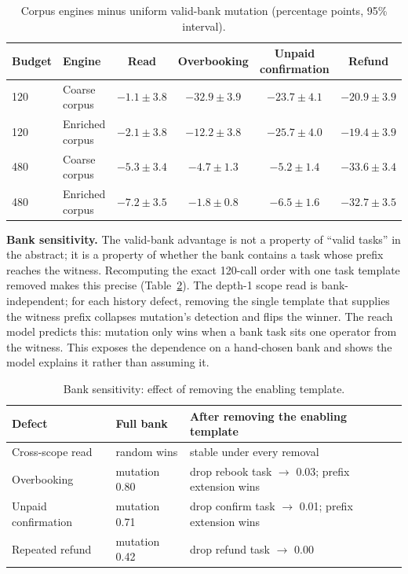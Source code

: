 \documentclass[conference]{IEEEtran}
\begin{document}
\begin{table}[t]
\caption{Corpus engines minus uniform valid-bank mutation (percentage points, 95\% interval).}
\label{tab:corpus}
\centering
\footnotesize
\begin{tabular}{@{}llcccc@{}}
\toprule
Budget & Engine & Read & Overbooking & Unpaid confirmation & Refund \\
\midrule
120 & Coarse corpus   & $-1.1\pm3.8$ & $-32.9\pm3.9$ & $-23.7\pm4.1$ & $-20.9\pm3.9$ \\
120 & Enriched corpus & $-2.1\pm3.8$ & $-12.2\pm3.8$ & $-25.7\pm4.0$ & $-19.4\pm3.9$ \\
480 & Coarse corpus   & $-5.3\pm3.4$ & $-4.7\pm1.3$  & $-5.2\pm1.4$  & $-33.6\pm3.4$ \\
480 & Enriched corpus & $-7.2\pm3.5$ & $-1.8\pm0.8$  & $-6.5\pm1.6$  & $-32.7\pm3.5$ \\
\bottomrule
\end{tabular}
\end{table}

\textbf{Bank sensitivity.} The valid-bank advantage is not a property of ``valid tasks''
in the abstract; it is a property of whether the bank contains a task whose prefix reaches
the witness. Recomputing the exact 120-call order with one task template removed makes
this precise (Table~\ref{tab:bank}). The depth-1 scope read is bank-independent; for each
history defect, removing the single template that supplies the witness prefix collapses
mutation's detection and flips the winner. The reach model predicts this: mutation only
wins when a bank task sits one operator from the witness. This exposes the dependence on a
hand-chosen bank and shows the model explains it rather than assuming it.

\begin{table}[t]
\caption{Bank sensitivity: effect of removing the enabling template.}
\label{tab:bank}
\centering
\footnotesize
\begin{tabular}{@{}lp{1.3cm}p{3.1cm}@{}}
\toprule
Defect & Full bank & After removing the enabling template \\
\midrule
Cross-scope read & random wins & stable under every removal \\
Overbooking & mutation 0.80 & drop rebook task $\rightarrow$ 0.03; prefix extension wins \\
Unpaid confirmation & mutation 0.71 & drop confirm task $\rightarrow$ 0.01; prefix extension wins \\
Repeated refund & mutation 0.42 & drop refund task $\rightarrow$ 0.00 \\
\bottomrule
\end{tabular}
\end{table}
\end{document}
